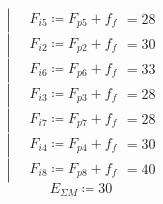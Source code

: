 \documentclass{article}
\newcommand{\defeq}{\coloneq} %
\begin{document}
\begin{equation*}

\left| \begin{aligned}
\,&\textit{F}_{\textit{i5}} \defeq \textit{F}_{\textit{p5}}+f_{f}\end{aligned} \right. = {28}
\end{equation*}
\begin{equation*}

\left| \begin{aligned}
\,&\textit{F}_{\textit{i2}} \defeq \textit{F}_{\textit{p2}}+f_{f}\end{aligned} \right. = {30}
\end{equation*}
\begin{equation*}

\left| \begin{aligned}
\,&\textit{F}_{\textit{i6}} \defeq \textit{F}_{\textit{p6}}+f_{f}\end{aligned} \right. = {33}
\end{equation*}
\begin{equation*}

\left| \begin{aligned}
\,&\textit{F}_{\textit{i3}} \defeq \textit{F}_{\textit{p3}}+f_{f}\end{aligned} \right. = {28}
\end{equation*}
\begin{equation*}

\left| \begin{aligned}
\,&\textit{F}_{\textit{i7}} \defeq \textit{F}_{\textit{p7}}+f_{f}\end{aligned} \right. = {28}
\end{equation*}
\begin{equation*}

\left| \begin{aligned}
\,&\textit{F}_{\textit{i4}} \defeq \textit{F}_{\textit{p4}}+f_{f}\end{aligned} \right. = {30}
\end{equation*}
\begin{equation*}

\left| \begin{aligned}
\,&\textit{F}_{\textit{i8}} \defeq \textit{F}_{\textit{p8}}+f_{f}\end{aligned} \right. = {40}
\end{equation*}
\begin{equation*}
E_{ΣM} \defeq 30
\end{equation*}
\end{document}
